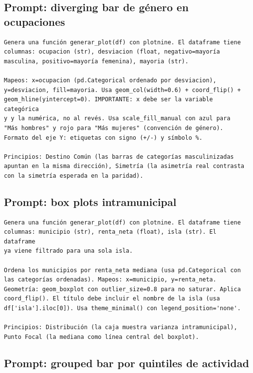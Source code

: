 \documentclass[spanish,a4paper,12pt,oneside]{extreport}
\begin{document}
\subsection*{Prompt: diverging bar de género en ocupaciones}

\begin{lstlisting}[language={},caption={Prompt para el diverging bar de brecha de género.}]
Genera una función generar_plot(df) con plotnine. El dataframe tiene
columnas: ocupacion (str), desviacion (float, negativo=mayoría
masculina, positivo=mayoría femenina), mayoria (str).

Mapeos: x=ocupacion (pd.Categorical ordenado por desviacion),
y=desviacion, fill=mayoria. Usa geom_col(width=0.6) + coord_flip() +
geom_hline(yintercept=0). IMPORTANTE: x debe ser la variable categórica
y y la numérica, no al revés. Usa scale_fill_manual con azul para
"Más hombres" y rojo para "Más mujeres" (convención de género).
Formato del eje Y: etiquetas con signo (+/-) y símbolo %.

Principios: Destino Común (las barras de categorías masculinizadas
apuntan en la misma dirección), Simetría (la asimetría real contrasta
con la simetría esperada en la paridad).
\end{lstlisting}

\subsection*{Prompt: box plots intramunicipal}

\begin{lstlisting}[language={},caption={Prompt para el box plot de desigualdad intramunicipal.}]
Genera una función generar_plot(df) con plotnine. El dataframe tiene
columnas: municipio (str), renta_neta (float), isla (str). El dataframe
ya viene filtrado para una sola isla.

Ordena los municipios por renta_neta mediana (usa pd.Categorical con
las categorías ordenadas). Mapeos: x=municipio, y=renta_neta.
Geometría: geom_boxplot con outlier_size=0.8 para no saturar. Aplica
coord_flip(). El título debe incluir el nombre de la isla (usa
df['isla'].iloc[0]). Usa theme_minimal() con legend_position='none'.

Principios: Distribución (la caja muestra varianza intramunicipal),
Punto Focal (la mediana como línea central del boxplot).
\end{lstlisting}

\subsection*{Prompt: grouped bar por quintiles de actividad}
\end{document}
